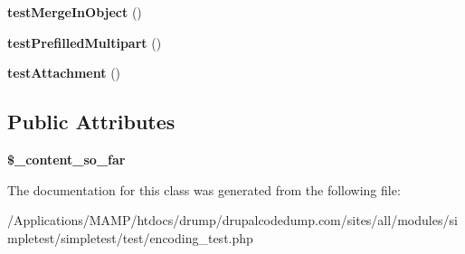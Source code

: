 \begin{DoxyCompactItemize}
\item 
\hypertarget{class_test_of_encoding_a898461dba379e70a24943191ffa7fe17}{
{\bfseries testMergeInObject} ()}
\label{class_test_of_encoding_a898461dba379e70a24943191ffa7fe17}

\item 
\hypertarget{class_test_of_encoding_adc1bc377ef888cfdaf4563f0665aab17}{
{\bfseries testPrefilledMultipart} ()}
\label{class_test_of_encoding_adc1bc377ef888cfdaf4563f0665aab17}

\item 
\hypertarget{class_test_of_encoding_aadc606495065ba54dc9e7a41e66f9859}{
{\bfseries testAttachment} ()}
\label{class_test_of_encoding_aadc606495065ba54dc9e7a41e66f9859}

\end{DoxyCompactItemize}
\subsection*{Public Attributes}
\begin{DoxyCompactItemize}
\item 
\hypertarget{class_test_of_encoding_a76ede0ecfaab523554158696f79b9d7c}{
{\bfseries \$\_\-content\_\-so\_\-far}}
\label{class_test_of_encoding_a76ede0ecfaab523554158696f79b9d7c}

\end{DoxyCompactItemize}


The documentation for this class was generated from the following file:\begin{DoxyCompactItemize}
\item 
/Applications/MAMP/htdocs/drump/drupalcodedump.com/sites/all/modules/simpletest/simpletest/test/encoding\_\-test.php\end{DoxyCompactItemize}
